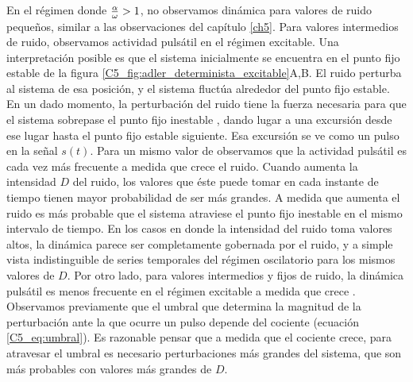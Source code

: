 \documentclass[./main.tex]{subfiles}
\begin{document}
En el régimen donde $\frac{\alpha}{\omega} >1$, no observamos dinámica para valores de ruido pequeños, similar a las observaciones del capítulo \ref{ch5}. Para valores intermedios de ruido, observamos actividad pulsátil en el régimen excitable. Una interpretación posible es que el sistema inicialmente se encuentra en el punto fijo estable \xxe de la figura \ref{C5_fig:adler_determinista_excitable}A,B. El ruido perturba al sistema de esa posición, y el sistema fluctúa alrededor del punto fijo estable. En un dado momento, la perturbación del ruido tiene la fuerza necesaria para que el sistema sobrepase el punto fijo inestable \xxi, dando lugar a una excursión desde ese lugar hasta el punto fijo estable siguiente. Esa excursión se ve como un pulso en la señal $s(t)$. Para un mismo valor de \ddelta observamos que la actividad pulsátil es cada vez más frecuente  a medida que crece el ruido. Cuando aumenta la intensidad $D$ del ruido, los valores que éste puede tomar en cada instante de tiempo tienen mayor probabilidad de ser más grandes. A medida que aumenta el ruido es más probable que el sistema atraviese el punto fijo inestable en el mismo intervalo de tiempo. En los casos en donde la intensidad del ruido toma valores altos, la dinámica parece ser completamente gobernada por el ruido, y a simple vista indistinguible de series temporales del régimen oscilatorio para los mismos valores de $D$. Por otro lado, para valores intermedios y fijos de ruido, la dinámica pulsátil es menos frecuente en el régimen excitable a medida que crece \ddelta. Observamos previamente que el umbral que determina la magnitud de la perturbación ante la que ocurre un pulso depende del cociente \ddelta (ecuación \ref{C5_eq:umbral}). Es razonable pensar que a medida que el cociente \ddelta crece, para atravesar el umbral es necesario perturbaciones más grandes del sistema, que son más probables con valores más grandes de $D$.
\end{document}
